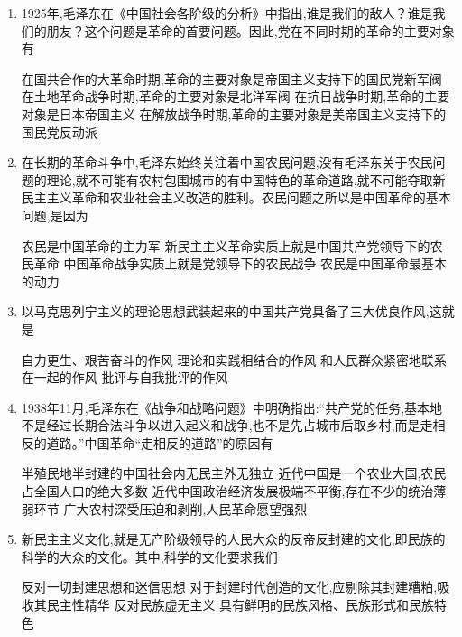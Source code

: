 \documentclass[12pt, a4paper, oneside, UTF8]{ctexbook}
\begin{document}
\begin{enumerate}
    
    \item 1925年,毛泽东在《中国社会各阶级的分析》中指出,谁是我们的敌人？谁是我们的朋友？这个问题是革命的首要问题。因此,党在不同时期的革命的主要对象有
    \begin{choices}[1]
    \task 在国共合作的大革命时期,革命的主要对象是帝国主义支持下的国民党新军阀
    \task 在土地革命战争时期,革命的主要对象是北洋军阀
    \task 在抗日战争时期,革命的主要对象是日本帝国主义
    \task 在解放战争时期,革命的主要对象是美帝国主义支持下的国民党反动派
    \end{choices}

    
    \item 在长期的革命斗争中,毛泽东始终关注着中国农民问题,没有毛泽东关于农民问题的理论,就不可能有农村包围城市的有中国特色的革命道路,就不可能夺取新民主主义革命和农业社会主义改造的胜利。农民问题之所以是中国革命的基本问题,是因为
    \begin{choices}[1]
    \task 农民是中国革命的主力军
    \task 新民主主义革命实质上就是中国共产党领导下的农民革命
    \task 中国革命战争实质上就是党领导下的农民战争
    \task 农民是中国革命最基本的动力
    \end{choices}

    
    \item 以马克思列宁主义的理论思想武装起来的中国共产党具备了三大优良作风,这就是
    \begin{choices}[1]
    \task 自力更生、艰苦奋斗的作风
    \task 理论和实践相结合的作风
    \task 和人民群众紧密地联系在一起的作风
    \task 批评与自我批评的作风
    \end{choices}

    
    \item 1938年11月,毛泽东在《战争和战略问题》中明确指出:“共产党的任务,基本地不是经过长期合法斗争以进入起义和战争,也不是先占城市后取乡村,而是走相反的道路。”中国革命“走相反的道路”的原因有
    \begin{choices}[1]
    \task 半殖民地半封建的中国社会内无民主外无独立
    \task 近代中国是一个农业大国,农民占全国人口的绝大多数
    \task 近代中国政治经济发展极端不平衡,存在不少的统治薄弱环节
    \task 广大农村深受压迫和剥削,人民革命愿望强烈
    \end{choices}

    
    \item 新民主主义文化,就是无产阶级领导的人民大众的反帝反封建的文化,即民族的科学的大众的文化。其中,科学的文化要求我们
    \begin{choices}[1]
    \task 反对一切封建思想和迷信思想
    \task 对于封建时代创造的文化,应剔除其封建糟粕,吸收其民主性精华
    \task 反对民族虚无主义
    \task 具有鲜明的民族风格、民族形式和民族特色
    \end{choices}
    

\end{enumerate}
\end{document}
